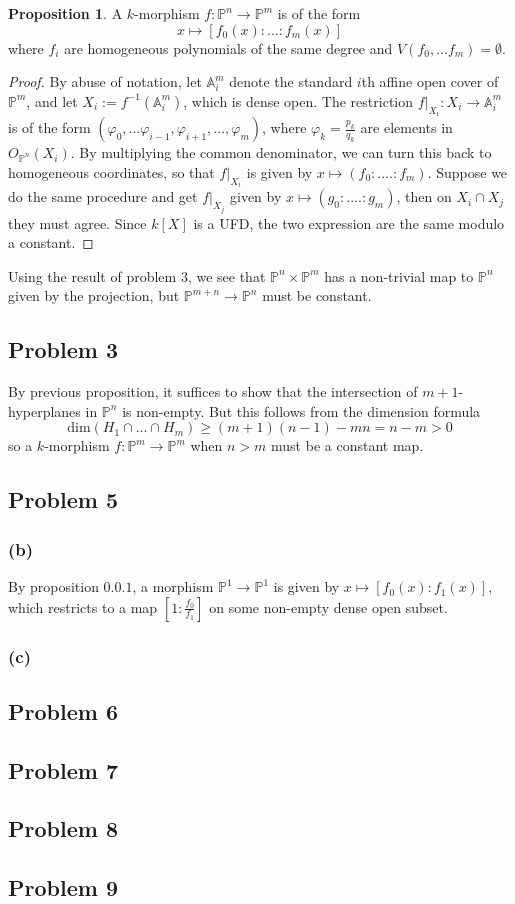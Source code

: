 \documentclass{article}
\theoremstyle{definition}
\theoremstyle{definition}
\theoremstyle{definition}
\theoremstyle{definition}
\newtheorem{proposition}{Proposition}[theorem]
\theoremstyle{definition}
\theoremstyle{definition}
\theoremstyle{definition}
\begin{document}
\begin{tcolorbox}[colback=blue!5!white,colframe=blue!30!white]
\begin{proposition}
A $k$-morphism $f:\mathbb{P}^n\to \mathbb{P}^m$ is of the form 
\[x\mapsto [f_0(x):...:f_m(x)]\]
where $f_i$ are homogeneous polynomials of the same degree and $V(f_0,...f_m)=\emptyset$.
\end{proposition}
\end{tcolorbox}
\begin{proof}
	By abuse of notation, let $\mathbb{A}_i^m$ denote the standard $i$th affine open cover of $\mathbb{P}^m$, and let $X_i:=f^{-1}(\mathbb{A}_i^m)$, which is dense open. The restriction $f|_{X_i}: X_i\to \mathbb{A}_i^m$ is of the form $(\varphi_0,...\varphi_{i-1},\varphi_{i+1},...,\varphi_m)$, where $\varphi_k=\frac{p_k}{q_k}$  are elements in $O_{\mathbb{P}^n}(X_i)$. By multiplying the common denominator, we can turn this back to homogeneous coordinates, so that $f|_{X_i}$ is given by $x\mapsto (f_0:....:f_m)$. Suppose we do the same procedure and get $f|_{X_j}$ given by $x\mapsto (g_0:....:g_m)$, then on $X_i\cap X_j$ they must agree. Since $k[X]$ is a UFD, the two expression are the same modulo a constant. 
\end{proof}

Using the result of problem $3$, we see that $\mathbb{P}^n\times \mathbb{P}^m$ has a non-trivial map to $\mathbb{P}^n$ given by the projection, but $\mathbb{P}^{m+n}\to \mathbb{P}^n$ must be constant. 



\subsection*{Problem 3}
By previous proposition, it suffices to show that the intersection of $m+1$-hyperplanes in $\mathbb{P}^n$ is non-empty. But this follows from the dimension formula
\[\textrm{dim}(H_1\cap...\cap H_m)\geq (m+1)(n-1)-mn=n-m>0\]
so a $k$-morphism $f: \mathbb{P}^m\to \mathbb{P}^m$ when $n>m$ must be a constant map. 

\subsection*{Problem 5}
\subsubsection*{(b)}
By proposition $0.0.1$, a morphism $\mathbb{P}^1\to \mathbb{P}^1$ is given by $x\mapsto [f_0(x):f_1(x)]$, which restricts to a map $[1: \frac{f_0}{f_1}]$ on some non-empty dense open subset. 

\subsubsection*{(c)}
\subsection*{Problem 6}
\subsection*{Problem 7}
\subsection*{Problem 8}
\subsection*{Problem 9}
\end{document}
